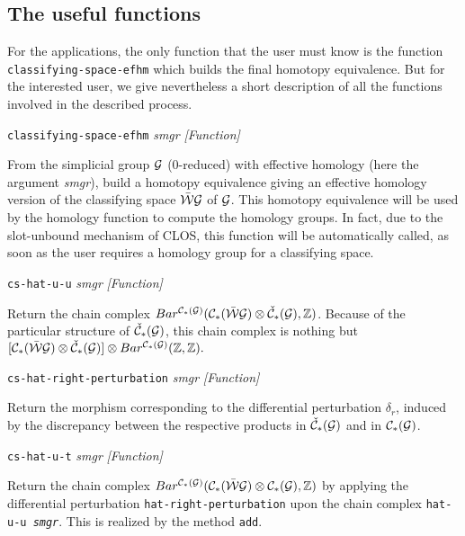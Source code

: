\subsection {The useful functions}

For the applications, the only function that the user must know is the function {\tt classifying-space-efhm}
which builds the final homotopy equivalence. But for the
interested user, we give nevertheless a short description of all the functions
involved in the described process.

\vskip 0.30cm
{\parindent=0mm
{\leftskip=5mm
{\tt classifying-space-efhm} {\em smgr}  \hfill {\em [Function]} \par}
{\leftskip=15mm
From the simplicial group ${\cal G}$ ($0$-reduced) with effective homology (here the argument {\em smgr}), build
a homotopy equivalence giving an effective homology version  of the classifying space $\bar{\cal W}{\cal G}$ of ${\cal G}$.
This homotopy
equivalence will be used by the homology function to compute the homology groups. In fact, due to
the slot-unbound mechanism of CLOS, this function will be automatically called, as soon
as the user requires a homology group for a classifying space. \par}
{\leftskip=5mm
{\tt cs-hat-u-u} {\em smgr}  \hfill {\em [Function]} \par}
{\leftskip=15mm
Return the chain complex
$Bar^{{\cal C}_*({\cal G})}({\cal C}_*(\bar{\cal W}{\cal G})\otimes {\check{\cal C}}_*({\cal G}),{\mathbb{Z}})$. Because of
the particular structure of ${\check{\cal C}}_*({\cal G})$, this chain complex is nothing but
$[{\cal C}_*(\bar{\cal W}{\cal G})\otimes {\check{\cal C}}_*({\cal G})]\otimes Bar^{{\cal C}_*({\cal G})}({\mathbb{Z}},{\mathbb{Z}}).$
\par}
{\leftskip=5mm
{\tt cs-hat-right-perturbation} {\em smgr}  \hfill {\em [Function]} \par}
{\leftskip=15mm
Return the morphism corresponding to the differential perturbation $\delta_r$, induced by
the discrepancy between the respective products in  ${\check{\cal C}}_*({\cal G})$ and
in ${\cal C}_*({\cal G})$. \par}
{\leftskip=5mm
{\tt cs-hat-u-t} {\em smgr}  \hfill {\em [Function]} \par}
{\leftskip=15mm
Return the chain complex
$Bar^{{\cal C}_*({\cal G})}({\cal C}_*(\bar{\cal W}{\cal G})\otimes {\cal C}_*({\cal G}),{\mathbb{Z}})$ by applying
the differential perturbation {\tt hat-right-perturbation} upon
the chain complex {\tt hat-u-u {\em smgr}}. This is realized by the method
{\tt add}. \par}
}
